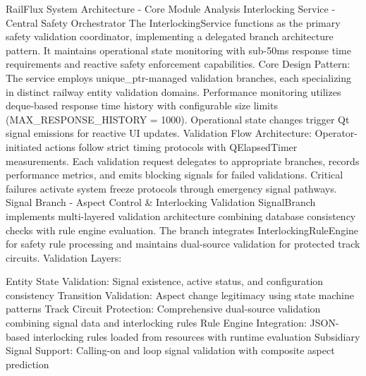 RailFlux System Architecture - Core Module Analysis
Interlocking Service - Central Safety Orchestrator
The InterlockingService functions as the primary safety validation coordinator, implementing a delegated branch architecture pattern. It maintains operational state monitoring with sub-50ms response time requirements and reactive safety enforcement capabilities.
Core Design Pattern: The service employs unique_ptr-managed validation branches, each specializing in distinct railway entity validation domains. Performance monitoring utilizes deque-based response time history with configurable size limits (MAX_RESPONSE_HISTORY = 1000). Operational state changes trigger Qt signal emissions for reactive UI updates.
Validation Flow Architecture: Operator-initiated actions follow strict timing protocols with QElapsedTimer measurements. Each validation request delegates to appropriate branches, records performance metrics, and emits blocking signals for failed validations. Critical failures activate system freeze protocols through emergency signal pathways.
Signal Branch - Aspect Control & Interlocking Validation
SignalBranch implements multi-layered validation architecture combining database consistency checks with rule engine evaluation. The branch integrates InterlockingRuleEngine for safety rule processing and maintains dual-source validation for protected track circuits.
Validation Layers:

Entity State Validation: Signal existence, active status, and configuration consistency
Transition Validation: Aspect change legitimacy using state machine patterns
Track Circuit Protection: Comprehensive dual-source validation combining signal data and interlocking rules
Rule Engine Integration: JSON-based interlocking rules loaded from resources with runtime evaluation
Subsidiary Signal Support: Calling-on and loop signal validation with composite aspect prediction

